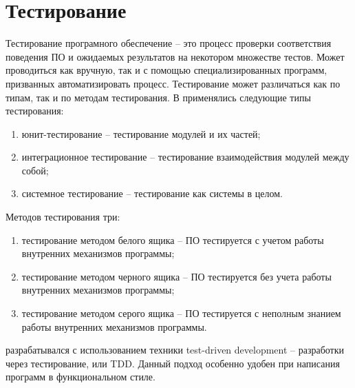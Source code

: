 \section{Тестирование {\ProgModule}}\label{sec:ch3/sec1/sub2}
Тестирование програмного обеспечение -- это процесс проверки соответствия поведения 
ПО и ожидаемых результатов на некотором множестве тестов. Может проводиться как вручную,
так и с помощью специализированных программ, призванных автоматизировать процесс.
Тестирование может различаться как по типам, так и по методам тестирования.
В {\ProgModule} применялись следующие типы тестирования:
\begin{enumerate}[label={\arabic*)}]
    \item юнит-тестирование -- тестирование модулей {\ProgModule} и их частей;
    \item интеграционное тестирование -- тестирование взаимодействия модулей
        {\ProgModule} между собой;
    \item системное тестирование -- тестирование {\ProgModule} как системы в целом.
\end{enumerate}
Методов тестирования три:
\begin{enumerate}[label={\arabic*)}]
    \item тестирование методом белого ящика -- ПО тестируется с учетом
        работы внутренних механизмов программы;
    \item тестирование методом черного ящика -- ПО тестируется без учета
        работы внутренних механизмов программы;
    \item тестирование методом серого ящика -- ПО тестируется с неполным знанием
        работы внутренних механизмов программы.
\end{enumerate}

{\ProgModule} разрабатывался с использованием техники test-driven development \autocite{TDD} 
-- разработки через тестирование, или TDD.
Данный подход особенно удобен при написания программ в функциональном стиле.

